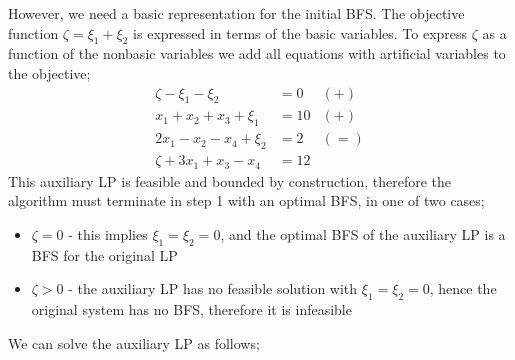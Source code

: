 \documentclass[a4paper, 12pt]{article}
\begin{document}
                However, we need a basic representation for the initial BFS.
                The objective function $\zeta = \xi_1 + \xi_2$ is expressed in terms of the basic variables.
                To express $\zeta$ as a function of the nonbasic variables we add all equations with artificial variables to the objective;
                \begin{align*}
                    \zeta - \xi_1 - \xi_2 & = 0 & (+) \\
                    x_1 + x_2 + x_3 + \xi_1 & = 10 & (+) \\
                    2x_1 - x_2 - x_4 + \xi_2 & = 2 & (=) \\
                    \zeta + 3x_1 + x_3 - x_4 & = 12
                \end{align*}
                This auxiliary LP is feasible and bounded by construction, therefore the algorithm must terminate in step 1 with an optimal BFS, in one of two cases;
                \begin{itemize}
                    \itemsep0em
                    \item $\zeta = 0$ - this implies $\xi_1 = \xi_2 = 0$, and the optimal BFS of the auxiliary LP is a BFS for the original LP
                    \item $\zeta > 0$ - the auxiliary LP has no feasible solution with $\xi_1 = \xi_2 = 0$, hence the original system has no BFS, therefore it is infeasible
                \end{itemize}
                We can solve the auxiliary LP as follows;
\end{document}
